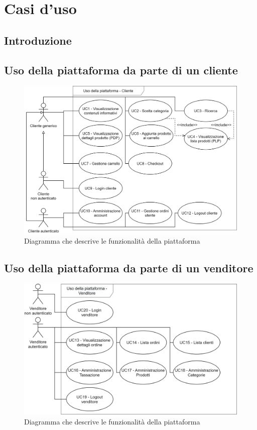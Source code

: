 \section{Casi d'uso}
\subsection{Introduzione}
\subsection{Uso della piattaforma da parte di un cliente}
\begin{figure}[H]
    \centering
    \includegraphics[width=\linewidth]{res/images/UC/cliente.png}
    \caption{Diagramma che descrive le funzionalità della piattaforma} 
\end{figure}
\subsection{Uso della piattaforma da parte di un venditore}
\begin{figure}[H]
    \centering
    \includegraphics[width=\linewidth]{res/images/UC/venditore.png}
    \caption{Diagramma che descrive le funzionalità della piattaforma} 
\end{figure}